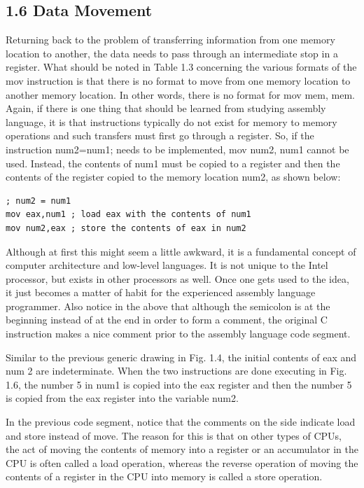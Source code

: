 \documentclass[10pt]{article}
\begin{document}
\subsection*{1.6 Data Movement}
Returning back to the problem of transferring information from one memory location to another, the data needs to pass through an intermediate stop in a register. What should be noted in Table 1.3 concerning the various formats of the mov instruction is that there is no format to move from one memory location to another memory location. In other words, there is no format for mov mem, mem. Again, if there is one thing that should be learned from studying assembly language, it is that instructions typically do not exist for memory to memory operations and such transfers must first go through a register. So, if the instruction num2=num1; needs to be implemented, mov num2, num1 cannot be used. Instead, the contents of num1 must be copied to a register and then the contents of the register copied to the memory location num2, as shown below:

\begin{verbatim}
; num2 = num1
mov eax,num1 ; load eax with the contents of num1
mov num2,eax ; store the contents of eax in num2
\end{verbatim}

Although at first this might seem a little awkward, it is a fundamental concept of computer architecture and low-level languages. It is not unique to the Intel processor, but exists in other processors as well. Once one gets used to the idea, it just becomes a matter of habit for the experienced assembly language programmer. Also notice in the above that although the semicolon is at the beginning instead of at the end in order to form a comment, the original C instruction makes a nice comment prior to the assembly language code segment.

Similar to the previous generic drawing in Fig. 1.4, the initial contents of eax and num 2 are indeterminate. When the two instructions are done executing in Fig. 1.6, the number 5 in num1 is copied into the eax register and then the number 5 is copied from the eax register into the variable num2.

In the previous code segment, notice that the comments on the side indicate load and store instead of move. The reason for this is that on other types of CPUs, the act of moving the contents of memory into a register or an accumulator in the CPU is often called a load operation, whereas the reverse operation of moving the contents of a register in the CPU into memory is called a store operation.
\end{document}

